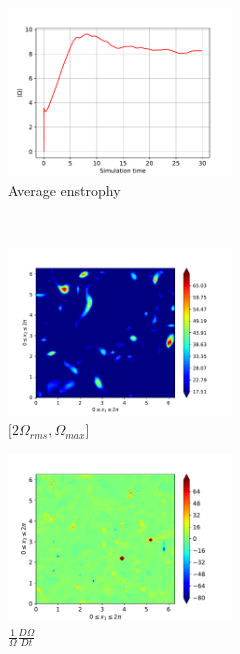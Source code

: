\begin{figure}[H]
    \begin{subfigure}[H]{0.45\textwidth}
        \includegraphics[height=1.75in]{media/run-cds-65/enst-average1340}
        \caption{Average enstrophy}
    \end{subfigure}
    ~
    \begin{subfigure}[H]{0.45\textwidth}
        \includegraphics[height=1.75in]{media/run-cds-65/enst-2-1340}
        \caption{$[2\Omega_{rms}, \Omega_{max} $] }
    \end{subfigure}
    \newline
    \begin{subfigure}[H]{0.45\textwidth}
        \includegraphics[height=1.75in]{media/run-cds-65/enst-1340}
        \caption{$\frac{1}{\Omega} \frac{D \Omega}{Dt}$}
    \end{subfigure}
    ~
    \begin{subfigure}{0.45\textwidth}

\end{subfigure}
\end{figure}
